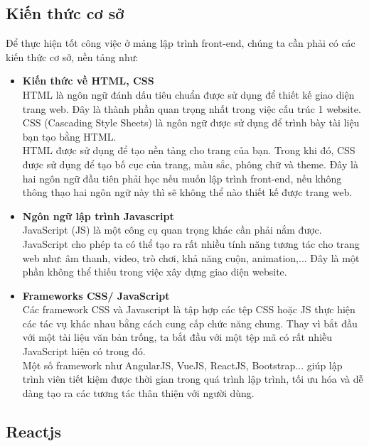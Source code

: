 \subsection{Kiến thức cơ sở}
\noindent Để thực hiện tốt công việc ở mảng lập trình front-end, chúng ta cần phải có các kiến thức cơ sở, nền
tảng như:
\begin{itemize}
  \item \textbf{Kiến thức về HTML, CSS}\\[0.2cm]
  HTML là ngôn ngữ đánh dấu tiêu chuẩn được sử dụng để thiết kế giao diện trang web. Đây là
thành phần quan trọng nhất trong việc cấu trúc 1 website. CSS (Cascading Style Sheets) là ngôn
ngữ được sử dụng để trình bày tài liệu bạn tạo bằng HTML.\\[0.5cm]
HTML được sử dụng để tạo nền tảng cho trang của bạn. Trong khi đó, CSS được sử dụng để tạo
bố cục của trang, màu sắc, phông chữ và theme. Đây là hai ngôn ngữ đầu tiên phải học nếu muốn
lập trình front-end, nếu không thông thạo hai ngôn ngữ này thì sẽ không thể nào thiết kế được
trang web.
  \item \textbf{Ngôn ngữ lập trình Javascript}\\[0.2cm]
  JavaScript (JS) là một công cụ quan trọng khác cần phải nắm được. JavaScript cho phép ta có thể
  tạo ra rất nhiều tính năng tương tác cho trang web như: âm thanh, video, trò chơi, khả năng cuộn,
  animation,... Đây là một phần không thể thiếu trong việc xây dựng giao diện website.
  \item \textbf{Frameworks CSS/ JavaScript}\\[0.2cm]
  Các framework CSS và Javascript là tập hợp các tệp CSS hoặc JS thực hiện các tác vụ khác nhau
  bằng cách cung cấp chức năng chung. Thay vì bắt đầu với một tài liệu văn bản trống, ta bắt đầu
  với một tệp mã có rất nhiều JavaScript hiện có trong đó.\\[0.5cm]
  Một số framework như AngularJS, VueJS, ReactJS, Bootstrap... giúp lập trình viên tiết kiệm được
thời gian trong quá trình lập trình, tối ưu hóa và dễ dàng tạo ra các tương tác thân thiện với người
dùng.
\end{itemize}
\subsection{Reactjs}
